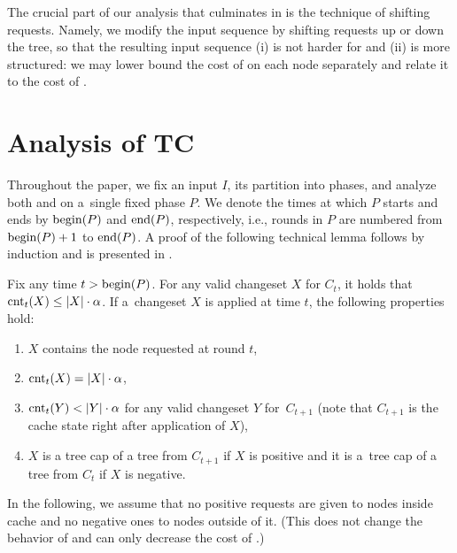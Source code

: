 The crucial part of our analysis that culminates in
 is the technique of shifting requests. Namely, we
modify the input sequence by shifting requests up or down the tree, so that
the resulting input sequence (i) is not harder for \OPT and (ii) is more
structured: we may lower bound the cost of \OPT on each node separately and
relate it to the cost of \ALGTC.




\section{Analysis of TC}
\label{sec:analysis}

Throughout the paper, we fix an input $I$, its partition into phases, and
analyze both \ALGTC and \OPT on a~single fixed phase $P$. We denote the times at
which $P$ starts and ends by $\textrm{begin}(P)$ and $\textrm{end}(P)$, respectively, i.e., rounds in
$P$ are numbered from $\textrm{begin}(P)+1$ to $\textrm{end}(P)$. A proof of the following technical
lemma follows by induction and is presented in 
.


\begin{lemma}
\label{lem:no_over-requested_changesets}
Fix any time $t > \textrm{begin}(P)$. For any valid changeset $X$ for $C_t$, it holds that
$\textrm{cnt}_t(X) \leq |X| \cdot \alpha$. If a~changeset $X$ is applied at time $t$,
the following properties hold:
\begin{enumerate}
\item $X$ contains the node requested at round $t$, 
\label{lemit:1}
\item $\textrm{cnt}_t(X) = |X| \cdot \alpha$, 
\label{lemit:2}
\item $\textrm{cnt}_t(Y) < |Y| \cdot \alpha$ for any valid changeset $Y$ for~$C_{t+1}$
(note that $C_{t+1}$ is the cache state right after application of $X$),
\label{lemit:3}
\item $X$ is a tree cap of a tree from $C_{t+1}$ if
$X$ is positive and it is a~tree cap of a tree from $C_t$ if $X$ is
negative.
\label{lemit:4}
\end{enumerate}
\end{lemma}

In the following, we assume that no positive requests are given to nodes
inside cache and no negative ones to nodes outside of it. (This does not
change the behavior of \ALGTC and can only decrease the cost of \OPT.)

